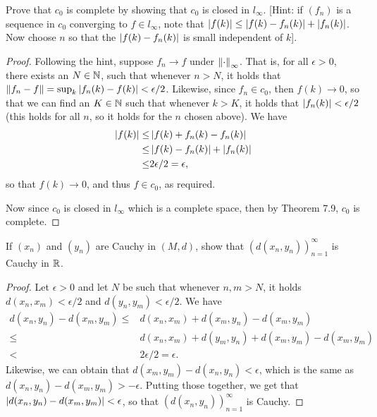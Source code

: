 \begin{exercise}{19}
Prove that $c_0$ is complete by showing that $c_0$ is closed in $l_\infty$.
[Hint: if $(f_n)$ is a sequence in $c_0$ converging to $f\in l_\infty$, note that $\left\lvert f(k)\right\rvert \leq \left\lvert f(k)-f_n(k)\right\rvert + \left\lvert f_n(k)\right\rvert$.
Now choose $n$ so that the $\left\lvert f(k)-f_n(k)\right\rvert$ is small independent of $k$]. 
\end{exercise}
\begin{proof}
Following the hint, suppose $f_n\to f$ under $\left\lVert \cdot\right\rVert_\infty$.
That is, for all $\epsilon>0$, there exists an $N\in\mathbb{N}$, such that whenever $n>N$, it holds that $\left\lVert f_n-f\right\rVert = \sup_k\left\lvert f_n(k)-f(k)\right\rvert < \epsilon/2$.
Likewise, since $f_n\in c_0$, then $f(k) \to 0$, so that we can find an $K\in\mathbb{N}$ such that whenever $k>K$, it holds that $\left\lvert f_n(k)\right\rvert <\epsilon/2$ (this holds for all $n$, so it holds for the $n$ chosen above).
We have
\begin{align*}
    \left\lvert f(k)\right\rvert 
    \leq& \left\lvert f(k) + f_n(k) - f_n(k)\right\rvert\\
    \leq& \left\lvert f(k) - f_n(k)\right\rvert + \left\lvert f_n(k)\right\rvert\\
    \leq& 2\epsilon/2 = \epsilon,
\end{align*}
so that $f(k)\to 0$, and thus $f\in c_0$, as required.

Now since $c_0$ is closed in $l_\infty$ which is a complete space, then by Theorem 7.9, $c_0$ is complete.
\end{proof} 

\begin{exercise}{20}
If $(x_n)$ and $(y_n)$ are Cauchy in $(M,d)$, show that $(d(x_n,y_n))^\infty_{n=1}$ is Cauchy in $\mathbb{R}$.
\end{exercise}
\begin{proof}
Let $\epsilon>0$ and let $N$ be such that whenever $n,m>N$, it holds $d(x_n,x_m)<\epsilon/2$ and $d(y_n,y_m)<\epsilon/2$.
We have
\begin{align*}
    d(x_n,y_n)-d(x_m,y_m)
    \leq& d(x_n,x_m) + d(x_m, y_n) - d(x_m,y_m)\\
    \leq& d(x_n,x_m) + d(y_m, y_n) + d(x_m,y_m) - d(x_m,y_m)\\
    <& 2\epsilon/2 = \epsilon.
\end{align*}
Likewise, we can obtain that $d(x_m,y_m)-d(x_n,y_n)<\epsilon$, which is the same as $d(x_n,y_n)-d(x_m,y_m)>-\epsilon$.
Putting those together, we get that $\left\lvert d(x_n,y_n)-d(x_m,y_m)\right\rvert<\epsilon$, so that $(d(x_n,y_n))^\infty_{n=1}$ is Cauchy.
\end{proof} 

